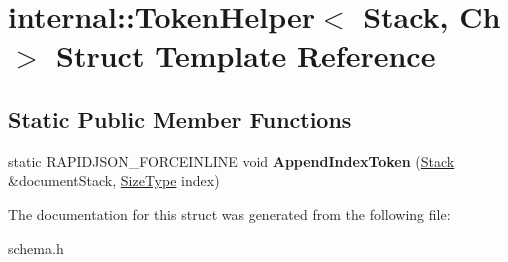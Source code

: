\hypertarget{a02396}{}\section{internal\+:\+:Token\+Helper$<$ Stack, Ch $>$ Struct Template Reference}
\label{a02396}
\subsection*{Static Public Member Functions}
\begin{DoxyCompactItemize}
\item 
\mbox{\label{a02396_a7b1864bfe6d4014ba7a5114acb26b3ae}} 
static R\+A\+P\+I\+D\+J\+S\+O\+N\+\_\+\+F\+O\+R\+C\+E\+I\+N\+L\+I\+NE void {\bfseries Append\+Index\+Token} (\hyperlink{a02288}{Stack} \&document\+Stack, \hyperlink{a00560_a5ed6e6e67250fadbd041127e6386dcb5}{Size\+Type} index)
\end{DoxyCompactItemize}


The documentation for this struct was generated from the following file\+:\begin{DoxyCompactItemize}
\item 
schema.\+h\end{DoxyCompactItemize}
